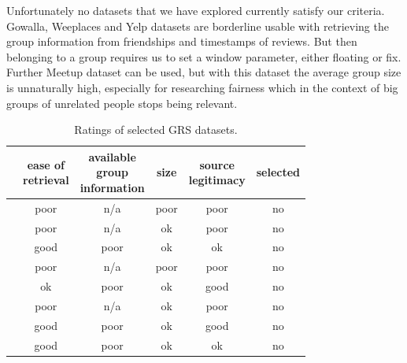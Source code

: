 Unfortunately no datasets that we have explored currently satisfy our criteria. Gowalla, Weeplaces and Yelp datasets are borderline usable with retrieving the group information from friendships and timestamps of reviews. But then belonging to a group requires us to set a window parameter, either floating or fix. Further Meetup dataset can be used, but with this dataset the average group size is unnaturally high, especially for researching fairness which in the context of big groups of unrelated people stops being relevant.

\begin{table}[!ht]
    \centering
    \begin{tabular}{ r | c c c c | c}
         & \makecell[c]{ease of \\ retrieval} & \makecell[c]{available \\ group \\ information} & size & \makecell[c]{source \\ legitimacy} & selected\\
        \hline
            \nameref{subsubsec:04_group_datasets.overview.camra}
                & poor & n/a & poor & poor & no\\
            \nameref{subsubsec:04_group_datasets.overview.douban}
                & poor & n/a & ok & poor & no \\
            \nameref{subsubsec:04_group_datasets.overview.gowalla}
                & good & poor & ok &  ok & no\\
            \nameref{subsubsec:04_group_datasets.overview.mafengwo}
                & poor & n/a & poor & poor & no\\
            \nameref{subsubsec:04_group_datasets.overview.meetup}
                & ok & poor & ok & good & no\\
            \nameref{subsubsec:04_group_datasets.overview.plancast}
                & poor & n/a & ok & poor & no\\
            \nameref{subsubsec:04_group_datasets.overview.yelp}
                & good & poor & ok & good & no\\
            \nameref{subsubsec:04_group_datasets.overview.weeplaces}
                &  good & poor & ok & ok & no\\
    \end{tabular}
    \caption{Ratings of selected GRS datasets.}
    \label{table:5.2_GRS_datasets_rating}
\end{table}


